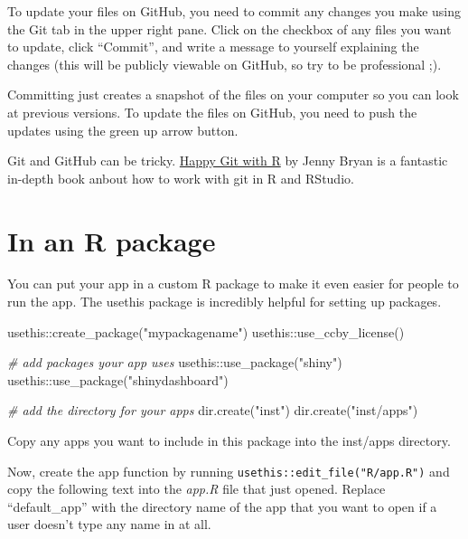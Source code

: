 \documentclass[
]{book}
\newenvironment{Shaded}{\begin{snugshade}}{\end{snugshade}}
\newcommand{\CommentTok}[1]{\textcolor[rgb]{0.56,0.35,0.01}{\textit{#1}}}
\newcommand{\FunctionTok}[1]{\textcolor[rgb]{0.00,0.00,0.00}{#1}}
\newcommand{\NormalTok}[1]{#1}
\newcommand{\SpecialCharTok}[1]{\textcolor[rgb]{0.00,0.00,0.00}{#1}}
\newcommand{\StringTok}[1]{\textcolor[rgb]{0.31,0.60,0.02}{#1}}
\begin{document}
To update your files on GitHub, you need to commit any changes you make using the Git tab in the upper right pane. Click on the checkbox of any files you want to update, click ``Commit'', and write a message to yourself explaining the changes (this will be publicly viewable on GitHub, so try to be professional ;).

Committing just creates a snapshot of the files on your computer so you can look at previous versions. To update the files on GitHub, you need to push the updates using the green up arrow button.

Git and GitHub can be tricky. \href{https://happygitwithr.com/}{Happy Git with R} by Jenny Bryan is a fantastic in-depth book anbout how to work with git in R and RStudio.

\hypertarget{in-an-r-package}{%
\section{In an R package}\label{in-an-r-package}}

You can put your app in a custom R package to make it even easier for people to run the app. The usethis package is incredibly helpful for setting up packages.

\begin{Shaded}
\begin{Highlighting}[]
\NormalTok{usethis}\SpecialCharTok{::}\FunctionTok{create\_package}\NormalTok{(}\StringTok{"mypackagename"}\NormalTok{)}
\NormalTok{usethis}\SpecialCharTok{::}\FunctionTok{use\_ccby\_license}\NormalTok{()}

\CommentTok{\# add packages your app uses}
\NormalTok{usethis}\SpecialCharTok{::}\FunctionTok{use\_package}\NormalTok{(}\StringTok{"shiny"}\NormalTok{)}
\NormalTok{usethis}\SpecialCharTok{::}\FunctionTok{use\_package}\NormalTok{(}\StringTok{"shinydashboard"}\NormalTok{)}

\CommentTok{\# add the directory for your apps}
\FunctionTok{dir.create}\NormalTok{(}\StringTok{"inst"}\NormalTok{)}
\FunctionTok{dir.create}\NormalTok{(}\StringTok{"inst/apps"}\NormalTok{)}
\end{Highlighting}
\end{Shaded}

Copy any apps you want to include in this package into the inst/apps directory.

Now, create the app function by running \texttt{usethis::edit\_file("R/app.R")} and copy the following text into the \emph{app.R} file that just opened. Replace ``default\_app'' with the directory name of the app that you want to open if a user doesn't type any name in at all.
\end{document}
